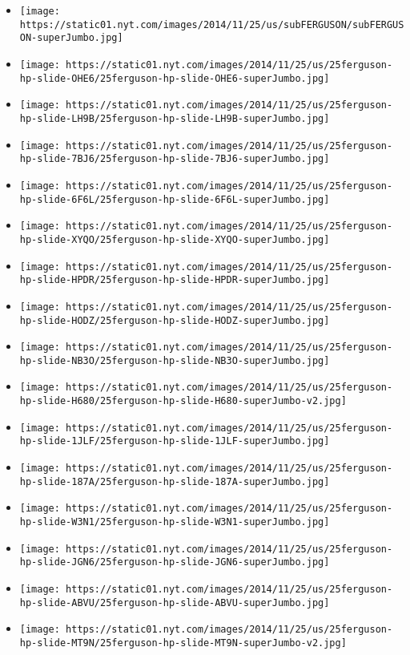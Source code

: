 \begin{itemize}
\item
  \texttt{[image: https://static01.nyt.com/images/2014/11/25/us/subFERGUSON/subFERGUSON-superJumbo.jpg]}
\item
  \texttt{[image: https://static01.nyt.com/images/2014/11/25/us/25ferguson-hp-slide-OHE6/25ferguson-hp-slide-OHE6-superJumbo.jpg]}
\item
  \texttt{[image: https://static01.nyt.com/images/2014/11/25/us/25ferguson-hp-slide-LH9B/25ferguson-hp-slide-LH9B-superJumbo.jpg]}
\item
  \texttt{[image: https://static01.nyt.com/images/2014/11/25/us/25ferguson-hp-slide-7BJ6/25ferguson-hp-slide-7BJ6-superJumbo.jpg]}
\item
  \texttt{[image: https://static01.nyt.com/images/2014/11/25/us/25ferguson-hp-slide-6F6L/25ferguson-hp-slide-6F6L-superJumbo.jpg]}
\item
  \texttt{[image: https://static01.nyt.com/images/2014/11/25/us/25ferguson-hp-slide-XYQO/25ferguson-hp-slide-XYQO-superJumbo.jpg]}
\item
  \texttt{[image: https://static01.nyt.com/images/2014/11/25/us/25ferguson-hp-slide-HPDR/25ferguson-hp-slide-HPDR-superJumbo.jpg]}
\item
  \texttt{[image: https://static01.nyt.com/images/2014/11/25/us/25ferguson-hp-slide-HODZ/25ferguson-hp-slide-HODZ-superJumbo.jpg]}
\item
  \texttt{[image: https://static01.nyt.com/images/2014/11/25/us/25ferguson-hp-slide-NB3O/25ferguson-hp-slide-NB3O-superJumbo.jpg]}
\item
  \texttt{[image: https://static01.nyt.com/images/2014/11/25/us/25ferguson-hp-slide-H680/25ferguson-hp-slide-H680-superJumbo-v2.jpg]}
\item
  \texttt{[image: https://static01.nyt.com/images/2014/11/25/us/25ferguson-hp-slide-1JLF/25ferguson-hp-slide-1JLF-superJumbo.jpg]}
\item
  \texttt{[image: https://static01.nyt.com/images/2014/11/25/us/25ferguson-hp-slide-187A/25ferguson-hp-slide-187A-superJumbo.jpg]}
\item
  \texttt{[image: https://static01.nyt.com/images/2014/11/25/us/25ferguson-hp-slide-W3N1/25ferguson-hp-slide-W3N1-superJumbo.jpg]}
\item
  \texttt{[image: https://static01.nyt.com/images/2014/11/25/us/25ferguson-hp-slide-JGN6/25ferguson-hp-slide-JGN6-superJumbo.jpg]}
\item
  \texttt{[image: https://static01.nyt.com/images/2014/11/25/us/25ferguson-hp-slide-ABVU/25ferguson-hp-slide-ABVU-superJumbo.jpg]}
\item
  \texttt{[image: https://static01.nyt.com/images/2014/11/25/us/25ferguson-hp-slide-MT9N/25ferguson-hp-slide-MT9N-superJumbo-v2.jpg]}
\end{itemize}

